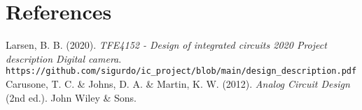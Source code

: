 \section*{References}

Larsen, B. B. (2020). \emph{TFE4152 - Design of integrated circuits 2020 Project description Digital camera}. \texttt{https://github.com/sigurdo/ic\_project/blob/main/design\_description.pdf}
Carusone, T. C. \& Johns, D. A. \& Martin, K. W. (2012). \emph{Analog Circuit Design} (2nd ed.). John Wiley \& Sons.